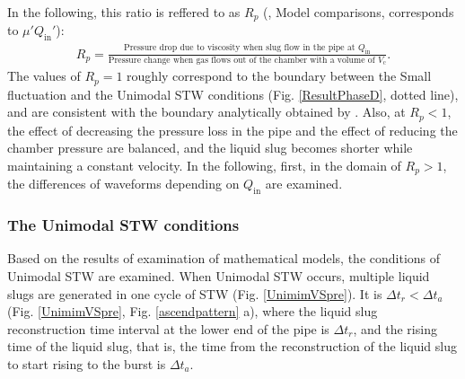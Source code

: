 \documentclass[aps,pre,preprint,groupedaddress,showkeys]{revtex4-2}
\begin{document}
In the following, this ratio is reffered to as $ R_p $ (\cite{kanno2018}, Model comparisons, corresponds to $ \mu' Q_ \mathrm{in} '$):
\begin{eqnarray}
R_p= \frac{\mbox{Pressure drop due to viscosity when slug flow in the pipe at $Q_ \mathrm {in}$}} {\mbox{Pressure change when gas flows out of the chamber with a volume of $V_\mathrm {c}$}}.  
\end{eqnarray}
The values of $ R_p = 1 $ roughly correspond to the boundary between the Small fluctuation and the Unimodal STW conditions (Fig. \ref{ResultPhaseD}, dotted line), and are consistent with the boundary analytically obtained by \cite {kanno2018}.
Also, at $ R_p <1 $, the effect of decreasing the pressure loss in the pipe and the effect of reducing the chamber pressure are balanced, and the liquid slug becomes shorter while maintaining a constant velocity.
In the following, first, in the domain of $ R_p> 1 $, the differences of waveforms depending on $Q_ \mathrm{in}$ are examined.


\subsubsection{The Unimodal STW conditions}
Based on the results of examination of mathematical models, the conditions of Unimodal STW are examined.
When Unimodal STW occurs, multiple liquid slugs are generated in one cycle of STW (Fig. \ref{UnimimVSpre}).
It is $ \Delta t_r <\Delta t_a $ (Fig. \ref{UnimimVSpre}, Fig. \ref{ascendpattern} a), where the liquid slug reconstruction time interval at the lower end of the pipe is $ \Delta t_r $, and the rising time of the liquid slug, that is, the time from the reconstruction of the liquid slug to start rising to the burst is $ \Delta t_a$. 
\end{document}

